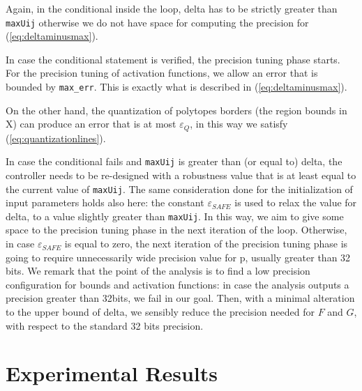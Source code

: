 \documentclass[sigconf]{acmart}
\newcommand{\statespace}{X}
\begin{document}
Again, in the conditional inside the loop, delta has to be strictly greater than \texttt{maxUij} otherwise we do not have space for computing the precision for (\ref{eq:deltaminusmax}).

In case the conditional statement is verified,
the precision tuning phase starts.
For the precision tuning of activation functions, we allow an error that is bounded by \texttt{max\_err}. This is exactly what is described in (\ref{eq:deltaminusmax}).

On the other hand, the quantization of polytopes borders (the region bounds in \statespace) can produce an error that is at most $\varepsilon_{Q}$, in this way we satisfy 
(\ref{eq:quantizationlines}).

In case the conditional fails and \texttt{maxUij} is greater than (or equal to) delta, the controller needs to be re-designed with a robustness value that is at least equal to the current value of \texttt{maxUij}. The same consideration done for the initialization of input parameters holds also here: the constant $\varepsilon_{SAFE}$ is used to relax the value for delta, to a value slightly greater than \texttt{maxUij}. In this way, we aim to give some space to the precision tuning phase in the next iteration of the loop. Otherwise, in case $\varepsilon_{SAFE}$ is equal to zero, the next iteration of the precision tuning phase is going to require unnecessarily wide precision value for p, usually greater than 32 bits. 
We remark that the point of the analysis is to find a low precision configuration for bounds and activation functions: in case the analysis outputs a precision greater than 32bits, we fail in our goal.
Then, with a minimal alteration to the upper bound of delta, we sensibly reduce the precision needed for $F$ and $G$, with respect to the standard 32 bits precision.

\section{Experimental Results}
\end{document}
